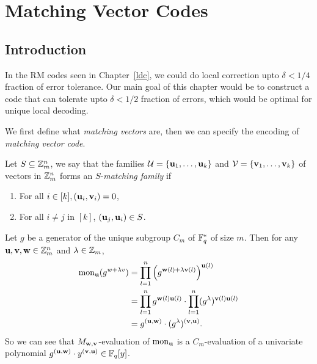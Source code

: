 \chapter{Matching Vector Codes}
\label{ch:mvc}

\section{Introduction}

In the RM codes seen in Chapter~\ref{ldc}, we could do local correction upto $\delta<1/4$ fraction of error tolerance. Our main goal of this chapter would be to construct a code that can tolerate upto $\delta<1/2$ fraction of errors, which would be optimal for unique local decoding.

We first define what \emph{matching vectors} are, then we can specify the encoding of \emph{matching vector code}.

  \begin{definition}\label{mvf}
    Let $S\subseteq\mathbb{Z}_{m}^n$, we say that the families $\mathcal{U} = \{\mathbf{u}_1, \ldots, \mathbf{u}_k\}$ and $\mathcal{V} = \{\mathbf{v}_1,\ldots, \mathbf{v}_k\}$ of vectors in $\mathbb{Z}_m^n$ forms an $S$-\emph{matching family} if 
    \begin{enumerate}
        \item For all $i\in[k], (\mathbf{u}_i, \mathbf{v}_i) = 0$, 
        \item For all $i\neq j$ in $[k]$, $(\mathbf{u}_j, \mathbf{u}_i) \in S$.
    \end{enumerate}
\end{definition}
\begin{observation}
        Let $g$ be a generator of the unique subgroup $C_m$ of $\mathbb{F}_q^*$ of size $m$. Then for any $\mathbf{u},\mathbf{v},\mathbf{w}\in\mathbb{Z}_m^n$ and $\lambda\in\mathbb{Z}_m$, 
        \begin{align*}
            \mathrm{mon}_{\mathbf{u}}(g^{w+\lambda v}) 
            & = \prod_{l=1}^n \left( g^{\mathbf{w}(l) + \lambda \mathbf{v}(l)} \right)^{\mathbf{u}(l)} \\
            & = \prod_{l=1}^n g^{\mathbf{w}(l)\mathbf{u}(l)}\cdot\prod_{l=1}^n(g^{\lambda})^{\mathbf{v}(l)\mathbf{u}(l)} \\
            & = g^{(\mathbf{u}, \mathbf{w})}\cdot (g^{\lambda})^{(\mathbf{v}, \mathbf{u})}.
        \end{align*}
        So we can see that $M_{\mathbf{w}, \mathbf{v}}$-evaluation of $\mathrm{mon}_{\mathbf{u}}$ is a $C_m$-evaluation of a univariate polynomial $g^{(\mathbf{u}, \mathbf{w})}\cdot y^{(\mathbf{v}, \mathbf{u})}\in\mathbb{F}_q[y]$.
    \end{observation}

